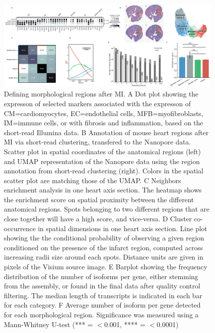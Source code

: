 \documentclass[utf8]{FrontiersinHarvard} %
\begin{document}
\begin{figure}[h!]
\begin{center}
\includegraphics[width=\textwidth]{figure2}
\end{center}
\caption{Defining morphological regions after MI. A Dot plot showing the expresson of selected markers associated with the expresson of CM=cardiomyocytes, EC=endothelial cells, MFB=myofibroblasts, IM=immune cells, or with fibrosis and inflammation, based on the short-read Illumina data. B Annotation of mouse heart regions after MI via short-read clustering, transfered to the Nanopore data. Scatter plot in spatial coordinates of the anatomical regions (left) and UMAP representation of the Nanopore data using the region annotation from short-read clustering (right). Colors in the spatial scatter plot are matching those of the UMAP. C Neighbors enrichment analysis in one heart axis section. The heatmap shows the enrichment score on spatial proximity between the different anatomical regions. Spots belonging to two different regions that are close together will have a high score, and vice-versa. D Cluster co-occurrence in spatial dimensions in one heart axis section. Line plot showing the the conditional probability of observing a given region conditioned on the presence of the infarct region, computed across increasing radii size around each spots. Distance units are given in pixels of the Visium source image. E Barplot showing the frequency distribution of the number of isoforms per gene, either stemming from the assembly, or found in the final data after quality control filtering. The median length of transcripts is indicated in each bar for each category. F Average number of isoform per gene detected for each morphological region. Significance was measured using a Mann-Whitney U-test (*** = $<$0.001, **** = $<$0.0001)}\label{fig:2}
\end{figure}
\end{document}
